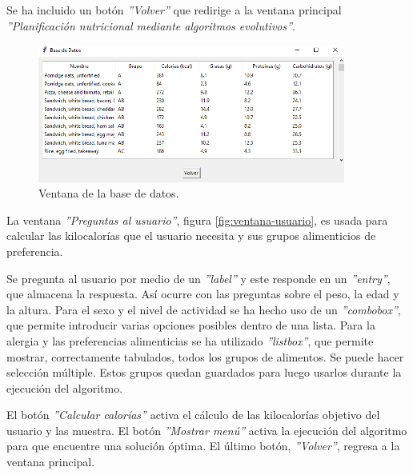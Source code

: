 Se ha incluido un botón \textit{''Volver''} que redirige a la ventana principal \textit{''Planificación nutricional mediante algoritmos evolutivos''}.

\begin{figure}[H]
    \centering
    \includegraphics[width=0.9\textwidth]{figures/ventana-basedatos.png}
    \caption{Ventana de la base de datos.}
    \label{fig:ventana-basedatos}
\end{figure}

La ventana \textit{''Preguntas al usuario''}, figura \ref{fig:ventana-usuario}, es usada para calcular las kilocalorías que el usuario necesita y sus grupos alimenticios de preferencia.

Se pregunta al usuario por medio de un \textit{''label''} y este responde en un \textit{''entry''}, que almacena la respuesta. Así ocurre con las preguntas sobre el peso, la edad y la altura. Para el sexo y el nivel de actividad se ha hecho uso de un \textit{''combobox''}, que permite introducir varias opciones posibles dentro de una lista. Para la alergia y las preferencias alimenticias se ha utilizado \textit{''listbox''}, que permite mostrar, correctamente tabulados, todos los grupos de alimentos. Se puede hacer selección múltiple. Estos grupos quedan guardados para luego usarlos durante la ejecución del algoritmo.

El botón \textit{''Calcular calorías''} activa el cálculo de las kilocalorías objetivo del usuario y las muestra. El botón \textit{''Mostrar menú''} activa la ejecución del algoritmo para que encuentre una solución óptima. El último botón, \textit{''Volver''}, regresa a la ventana principal.

